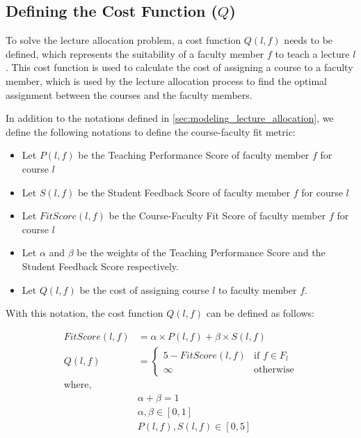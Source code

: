 \subsection{Defining the Cost Function (\texorpdfstring{$Q$}{Q})}
\label{sec:defining_the_cost_function}

To solve the lecture allocation problem, a cost function \(Q(l, f)\) needs to be defined, which represents the suitability of a faculty member \( f \) to teach a lecture \( l \). This cost function is used to calculate the cost of assigning a course to a faculty member, which is used by the lecture allocation process to find the optimal assignment between the courses and the faculty members.

In addition to the notations defined in \autoref{sec:modeling_lecture_allocation}, we define the following notations to define the course-faculty fit metric:

\begin{itemize}
  \item Let \( P(l, f) \) be the Teaching Performance Score of faculty member \( f \) for course \( l \)
  \item Let \( S(l, f) \) be the Student Feedback Score of faculty member \( f \) for course \( l \)
  \item Let \( FitScore(l, f) \) be the Course-Faculty Fit Score of faculty member \( f \) for course \( l \)
  \item Let \( \alpha \) and \( \beta \) be the weights of the Teaching Performance Score and the Student Feedback Score respectively.
  \item Let \( Q(l, f) \) be the cost of assigning course \( l \) to faculty member \( f \).
\end{itemize}

With this notation, the cost function \( Q(l, f) \) can be defined as follows:

\begin{equation}
  \label{eq:cost_function}
  \begin{aligned}
    FitScore(l, f) & = \alpha \times P(l, f) + \beta \times S(l, f) \\
    Q(l, f)        & = \begin{cases}
                         5 - FitScore(l, f) & \text{if } f \in F_l \\
                         \infty             & \text{otherwise}
                       \end{cases}    \\
    \text{where, } &                                                \\
                   & \alpha + \beta = 1                             \\
                   & \alpha, \beta \in [0, 1]                       \\
                   & P(l, f), S(l, f) \in [0, 5]
  \end{aligned}
\end{equation}

